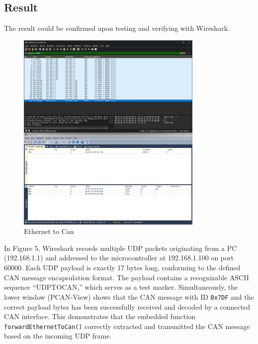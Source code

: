 \subsection{Result}

The result could be confirmed upon testing and verifying with Wireshark.
\begin{figure}[h]
    \centering
     \includegraphics[width=0.8\textwidth]{figures/pictures/ethtocan.png}
    \caption{Ethernet to Can}
    \label{fig:results}
\end{figure}
In Figure 5, Wireshark records multiple UDP packets originating from a PC (192.168.1.1) and addressed to the microcontroller at 192.168.1.100 on port 60000. Each UDP payload is exactly 17 bytes long, conforming to the defined CAN message encapsulation format. The payload contains a recognizable ASCII sequence “UDPTOCAN,” which serves as a test marker. Simultaneously, the lower window (PCAN-View) shows that the CAN message with ID \verb|0x7DF| and the correct payload bytes has been successfully received and decoded by a connected CAN interface. This demonstrates that the embedded function \verb|forwardEthernetToCan()| correctly extracted and transmitted the CAN message based on the incoming UDP frame.

